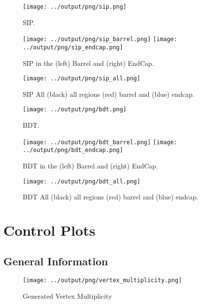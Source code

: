\documentclass[11pt]{book}
\begin{document}
\begin{figure}[ht]
\centering
\texttt{[image: ../output/png/sip.png]}
\caption{SIP.}
\label{fig:sip}
\end{figure}
\clearpage

\begin{figure}[ht]
\centering
\texttt{[image: ../output/png/sip\_barrel.png]}
\texttt{[image: ../output/png/sip\_endcap.png]}
\caption{SIP in the (left) Barrel and (right) EndCap.}
\label{fig:sip_regions}
\end{figure}

\begin{figure}[ht]
\centering
\texttt{[image: ../output/png/sip\_all.png]}
\caption{SIP All (black) all regions (red) barrel and (blue) endcap.}
\label{fig:sip_all}
\end{figure}

\begin{figure}[ht]
\centering
\texttt{[image: ../output/png/bdt.png]}
\caption{BDT.}
\label{fig:bdt}
\end{figure}
\clearpage

\begin{figure}[ht]
\centering
\texttt{[image: ../output/png/bdt\_barrel.png]}
\texttt{[image: ../output/png/bdt\_endcap.png]}
\caption{BDT in the (left) Barrel and (right) EndCap.}
\label{fig:bdt_regions}
\end{figure}

\begin{figure}[ht]
\centering
\texttt{[image: ../output/png/bdt\_all.png]}
\caption{BDT All (black) all regions (red) barrel and (blue) endcap.}
\label{fig:bdt_all}
\end{figure}

\clearpage

\chapter{Control Plots}
\section{General Information}
\begin{figure}[ht]
\centering
\texttt{[image: ../output/png/vertex\_multiplicity.png]}
\caption{Generated Vertex Multiplicity}
\label{fig:vertex_multiplicity}
\end{figure}
\clearpage
\clearpage
\end{document}
